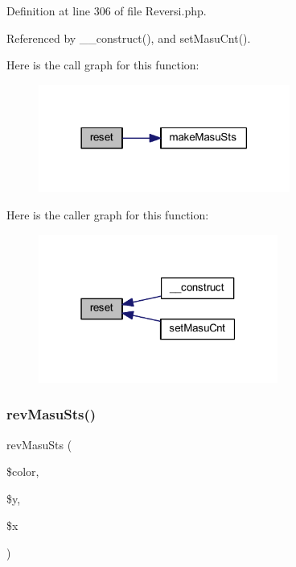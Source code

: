 Definition at line 306 of file Reversi.\+php.



Referenced by \+\_\+\+\_\+construct(), and set\+Masu\+Cnt().

Here is the call graph for this function\+:
\nopagebreak
\begin{figure}[H]
\begin{center}
\leavevmode
\includegraphics[width=234pt]{class_reversi_a4a20559544fdf4dcb457e258dc976cf8_cgraph}
\end{center}
\end{figure}
Here is the caller graph for this function\+:
\nopagebreak
\begin{figure}[H]
\begin{center}
\leavevmode
\includegraphics[width=223pt]{class_reversi_a4a20559544fdf4dcb457e258dc976cf8_icgraph}
\end{center}
\end{figure}
\mbox{\label{class_reversi_af29cd3f41dc1cffead056dbbed55ae7a}} 
\subsubsection{\texorpdfstring{rev\+Masu\+Sts()}{revMasuSts()}}
{\footnotesize\ttfamily rev\+Masu\+Sts (\begin{DoxyParamCaption}\item[{}]{\$color,  }\item[{}]{\$y,  }\item[{}]{\$x }\end{DoxyParamCaption})\hspace{0.3cm}{\ttfamily [private]}}



